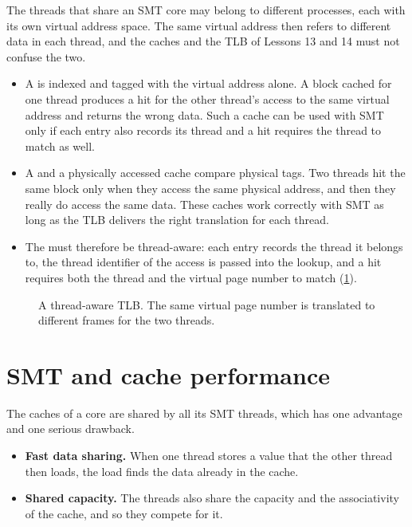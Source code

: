 \documentclass[../main.tex]{subfiles}
\begin{document}
The threads that share an SMT core may belong to different processes, each
with its own virtual address space.  The same virtual address then refers to different data in each
thread, and the caches and the TLB of Lessons 13 and 14 must not confuse the
two.
\begin{itemize}
  \item A  is indexed and tagged with the
    virtual address alone.  A block cached for one thread produces a hit for
    the other thread's access to the same virtual address and returns the
    wrong data.  Such a cache can be used with SMT only if each entry also
    records its thread and a hit requires the thread to match as well.
  \item A  and a physically accessed
    cache compare physical tags.  Two threads hit the same block only when
    they access the same physical address, and then they really do access
    the same data.  These caches work correctly with SMT as long as the TLB
    delivers the right translation for each thread.
  \item The  must therefore be thread-aware: each entry records the
    thread it belongs to, the thread identifier of the access is passed into
    the lookup, and a hit requires both the thread and the virtual page
    number to match (\cref{fig:l18-smt-tlb}).
\end{itemize}

\begin{figure}[htbp]
  \centering
  
  \caption{A thread-aware TLB.  The same virtual page number is translated
    to different frames for the two threads.}
  \label{fig:l18-smt-tlb}
\end{figure}

\section{SMT and cache performance}
\label{sec:l18-smt-cache}

The caches of a core are shared by all its SMT threads, which has one
advantage and one serious drawback.
\begin{itemize}
  \item \textbf{Fast data sharing.}  When one thread stores a value that
    the other thread then loads, the load finds the data already in the
    cache.
  \item \textbf{Shared capacity.}  The threads also share the capacity and
    the associativity of the cache, and so they compete for it.
\end{itemize}
\end{document}
